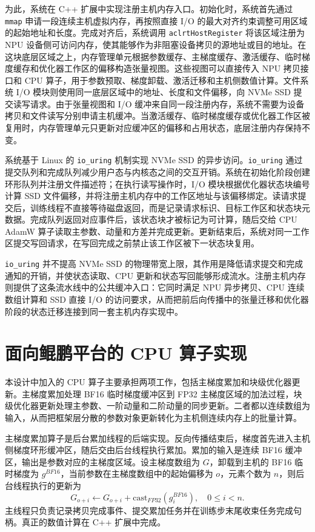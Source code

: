 \documentclass[bachelor,openany,oneside,color,AutoFakeBold=true]{buaathesis}
\begin{document}
为此，系统在 C++ 扩展中实现注册主机内存入口。初始化时，系统首先通过 \texttt{mmap} 申请一段连续主机虚拟内存，再按照直接 I/O 的最大对齐约束调整可用区域的起始地址和长度。完成对齐后，系统调用 \texttt{aclrtHostRegister} 将该区域注册为 NPU 设备侧可访问内存，使其能够作为非阻塞设备拷贝的源地址或目的地址。在这块底层区域之上，内存管理单元根据参数缓存、主梯度缓存、激活缓存、临时梯度缓存和优化器工作区的偏移构造张量视图。这些视图可以直接传入 NPU 拷贝接口和 CPU 算子，用于参数预取、梯度卸载、激活迁移和主机侧数值计算。文件系统 I/O 模块则使用同一底层区域中的地址、长度和文件偏移，向 NVMe SSD 提交读写请求。由于张量视图和 I/O 缓冲来自同一段注册内存，系统不需要为设备拷贝和文件读写分别申请主机缓冲。当激活缓存、临时梯度缓存或优化器工作区被复用时，内存管理单元只更新对应缓冲区的偏移和占用状态，底层注册内存保持不变。

系统基于 Linux 的 \texttt{io\_uring} 机制实现 NVMe SSD 的异步访问。\texttt{io\_uring} 通过提交队列和完成队列减少用户态与内核态之间的交互开销。系统在初始化阶段创建环形队列并注册文件描述符；在执行读写操作时，I/O 模块根据优化器状态块编号计算 SSD 文件偏移，并将注册主机内存中的工作区地址与该偏移绑定。读请求提交后，训练线程不直接等待磁盘返回，而是记录请求标识、目标工作区和状态块元数据。完成队列返回对应事件后，该状态块才被标记为可计算，随后交给 CPU AdamW 算子读取主参数、动量和方差并完成更新。更新结束后，系统对同一工作区提交写回请求，在写回完成之前禁止该工作区被下一状态块复用。

\texttt{io\_uring} 并不提高 NVMe SSD 的物理带宽上限，其作用是降低请求提交和完成通知的开销，并使状态读取、CPU 更新和状态写回能够形成流水。注册主机内存则提供了这条流水线中的公共缓冲入口：它同时满足 NPU 异步拷贝、CPU 连续数组计算和 SSD 直接 I/O 的访问要求，从而把前后向传播中的张量迁移和优化器阶段的状态迁移连接到同一套主机内存实现中。

\section{面向鲲鹏平台的 CPU 算子实现}
本设计中加入的 CPU 算子主要承担两项工作，包括主梯度累加和块级优化器更新。主梯度累加处理 BF16 临时梯度缓冲区到 FP32 主梯度区域的加法过程，块级优化器更新处理主参数、一阶动量和二阶动量的同步更新。二者都以连续数组为输入，从而把框架层分散的参数对象更新转化为主机侧连续内存上的批量计算。

主梯度累加算子是后台累加线程的后端实现。反向传播结束后，梯度首先进入主机侧梯度环形缓冲区，随后交由后台线程执行累加。累加的输入是连续 BF16 缓冲区，输出是参数对应的主梯度区域。设主梯度数组为 $G$，卸载到主机的 BF16 临时梯度为 $g^{BF16}$，当前参数在主梯度数组中的起始偏移为 $o$，元素个数为 $n$，则后台线程执行的更新为
\[
G_{o+i} \leftarrow G_{o+i} + \mathrm{cast}_{FP32}(g^{BF16}_i),
\quad 0 \le i < n .
\]
主线程只负责记录拷贝完成事件、提交累加任务并在训练步末尾收束任务完成句柄。真正的数值计算在 C++ 扩展中完成。
\end{document}
